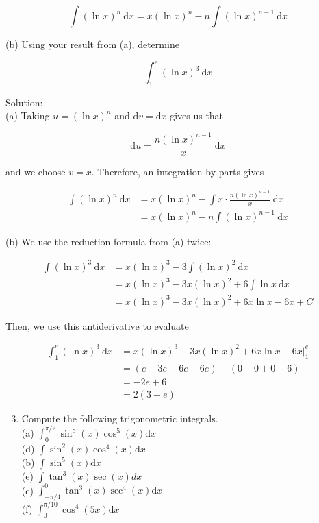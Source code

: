 \documentclass[10pt]{article}
\begin{document}
$$
\int(\ln x)^{n} \mathrm{~d} x=x(\ln x)^{n}-n \int(\ln x)^{n-1} \mathrm{~d} x
$$

(b) Using your result from (a), determine

$$
\int_{1}^{e}(\ln x)^{3} \mathrm{~d} x
$$

Solution:\\
(a) Taking $u=(\ln x)^{n}$ and $\mathrm{d} v=\mathrm{d} x$ gives us that

$$
\mathrm{d} u=\frac{n(\ln x)^{n-1}}{x} \mathrm{~d} x
$$

and we choose $v=x$. Therefore, an integration by parts gives

$$
\begin{aligned}
\int(\ln x)^{n} \mathrm{~d} x & =x(\ln x)^{n}-\int x \cdot \frac{n(\ln x)^{n-1}}{x} \mathrm{~d} x \\
& =x(\ln x)^{n}-n \int(\ln x)^{n-1} \mathrm{~d} x
\end{aligned}
$$

(b) We use the reduction formula from (a) twice:

$$
\begin{aligned}
\int(\ln x)^{3} \mathrm{~d} x & =x(\ln x)^{3}-3 \int(\ln x)^{2} \mathrm{~d} x \\
& =x(\ln x)^{3}-3 x(\ln x)^{2}+6 \int \ln x \mathrm{~d} x \\
& =x(\ln x)^{3}-3 x(\ln x)^{2}+6 x \ln x-6 x+C
\end{aligned}
$$

Then, we use this antiderivative to evaluate

$$
\begin{aligned}
\int_{1}^{e}(\ln x)^{3} \mathrm{~d} x & =x(\ln x)^{3}-3 x(\ln x)^{2}+6 x \ln x-\left.6 x\right|_{1} ^{e} \\
& =(e-3 e+6 e-6 e)-(0-0+0-6) \\
& =-2 e+6 \\
& =2(3-e)
\end{aligned}
$$

\begin{enumerate}
  \setcounter{enumi}{2}
  \item Compute the following trigonometric integrals.\\
(a) $\int_{0}^{\pi / 2} \sin ^{8}(x) \cos ^{5}(x) \mathrm{d} x$\\
(d) $\int \sin ^{2}(x) \cos ^{4}(x) \mathrm{d} x$\\
(b) $\int \sin ^{5}(x) \mathrm{d} x$\\
(e) $\int \tan ^{3}(x) \sec (x) d x$\\
(c) $\int_{-\pi / 4}^{0} \tan ^{3}(x) \sec ^{4}(x) \mathrm{d} x$\\
(f) $\int_{0}^{\pi / 10} \cos ^{4}(5 x) \mathrm{d} x$
\end{enumerate}
\end{document}
